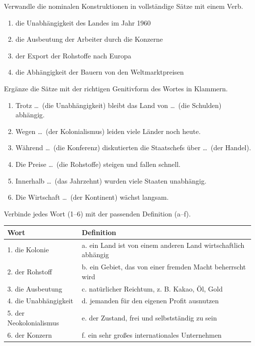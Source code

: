 \documentclass[11pt]{article}
\begin{document}
\begin{exercice}
Verwandle die nominalen Konstruktionen in vollständige Sätze mit einem Verb.
\begin{enumerate}
\item die Unabhängigkeit des Landes im Jahr 1960
\item die Ausbeutung der Arbeiter durch die Konzerne
\item der Export der Rohstoffe nach Europa
\item die Abhängigkeit der Bauern von den Weltmarktpreisen
\end{enumerate}
\end{exercice}

\begin{exercice}
Ergänze die Sätze mit der richtigen Genitivform des Wortes in Klammern.
\begin{enumerate}
\item Trotz \ldots\ (die Unabhängigkeit) bleibt das Land von \ldots\ (die Schulden) abhängig.
\item Wegen \ldots\ (der Kolonialismus) leiden viele Länder noch heute.
\item Während \ldots\ (die Konferenz) diskutierten die Staatschefs über \ldots\ (der Handel).
\item Die Preise \ldots\ (die Rohstoffe) steigen und fallen schnell.
\item Innerhalb \ldots\ (das Jahrzehnt) wurden viele Staaten unabhängig.
\item Die Wirtschaft \ldots\ (der Kontinent) wächst langsam.
\end{enumerate}
\end{exercice}

\begin{exercice}
Verbinde jedes Wort (1--6) mit der passenden Definition (a--f).
\begin{center}
\begin{tabular}{|l|l|}
\hline
\rowcolor{popblueL} Wort & Definition \\
\hline
1. die Kolonie & a. ein Land ist von einem anderen Land wirtschaftlich abhängig \\
\hline
2. der Rohstoff & b. ein Gebiet, das von einer fremden Macht beherrscht wird \\
\hline
3. die Ausbeutung & c. natürlicher Reichtum, z. B. Kakao, Öl, Gold \\
\hline
4. die Unabhängigkeit & d. jemanden für den eigenen Profit ausnutzen \\
\hline
5. der Neokolonialismus & e. der Zustand, frei und selbstständig zu sein \\
\hline
6. der Konzern & f. ein sehr großes internationales Unternehmen \\
\hline
\end{tabular}
\end{center}
\end{exercice}
\end{document}
